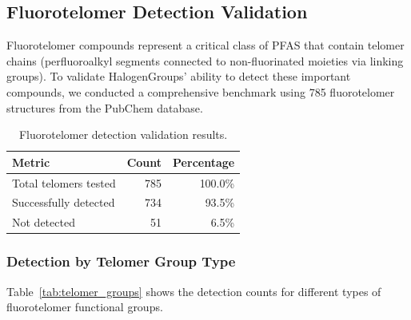 
\subsection*{Fluorotelomer Detection Validation}

Fluorotelomer compounds represent a critical class of PFAS that contain telomer chains (perfluoroalkyl segments connected to non-fluorinated moieties via linking groups). To validate HalogenGroups' ability to detect these important compounds, we conducted a comprehensive benchmark using 785 fluorotelomer structures from the PubChem database.

\begin{table}[htbp]
\centering
\caption{Fluorotelomer detection validation results.}
\label{tab:telomer_validation}
\begin{tabular}{lrr}
\toprule
\textbf{Metric} & \textbf{Count} & \textbf{Percentage} \\
\midrule
Total telomers tested & 785 & 100.0\% \\
Successfully detected & 734 & 93.5\% \\
Not detected & 51 & 6.5\% \\
\bottomrule
\end{tabular}
\end{table}

\subsubsection*{Detection by Telomer Group Type}

Table~\ref{tab:telomer_groups} shows the detection counts for different types of fluorotelomer functional groups.

